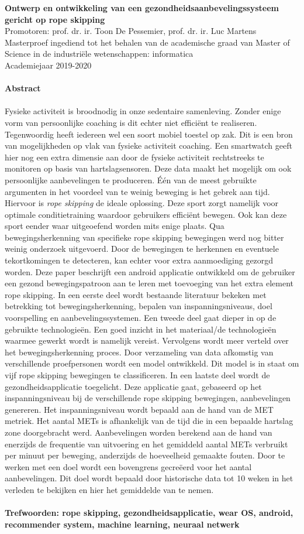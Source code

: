 \textbf{\Huge Ontwerp en ontwikkeling van een gezondheidsaanbevelingssysteem gericht op rope skipping} \\

Promotoren: prof. dr. ir. Toon De Pessemier, prof. dr. ir. Luc Martens \\
Masterproef ingediend tot het behalen van de academische graad van Master of Science in de industriële wetenschappen: informatica \\
Academiejaar 2019-2020
\\\\
\textbf{\LARGE Abstract} \\\\
Fysieke activiteit is broodnodig in onze sedentaire samenleving. Zonder enige vorm van persoonlijke coaching is dit echter niet efficiënt te realiseren. Tegenwoordig heeft iedereen wel een soort mobiel toestel op zak. Dit is een bron van mogelijkheden op vlak van fysieke activiteit coaching. Een smartwatch geeft hier nog een extra dimensie aan door de fysieke activiteit rechtstreeks te monitoren op basis van hartslagsensoren. Deze data maakt het mogelijk om ook persoonlijke aanbevelingen te produceren.
Één van de meest gebruikte argumenten in het voordeel van te weinig beweging is het gebrek aan tijd. Hiervoor is \textit{rope skipping} de ideale oplossing. Deze sport zorgt namelijk voor optimale conditietraining waardoor gebruikers efficiënt bewegen. Ook kan deze sport eender waar uitgeoefend worden mits enige plaats. Qua bewegingsherkenning van specifieke rope skipping bewegingen werd nog bitter weinig onderzoek uitgevoerd. Door de bewegingen te herkennen en eventuele tekortkomingen te detecteren, kan echter voor extra aanmoediging gezorgd worden.
Deze paper beschrijft een android applicatie ontwikkeld om de gebruiker een gezond bewegingspatroon aan te leren met toevoeging van het extra element rope skipping. 
In een eerste deel wordt bestaande literatuur bekeken met betrekking tot bewegingsherkenning, bepalen van inspanningsniveaus, doel voorspelling en aanbevelingssystemen.
Een tweede deel gaat dieper in op de gebruikte technologieën. Een goed inzicht in het materiaal/de technologieën waarmee gewerkt wordt is namelijk vereist. 
Vervolgens wordt meer verteld over het bewegingsherkenning proces. Door verzameling van data afkomstig van verschillende proefpersonen wordt een model ontwikkeld. Dit model is in staat om vijf rope skipping bewegingen te classificeren.
In een laatste deel wordt de gezondheidsapplicatie toegelicht. Deze applicatie gaat, gebaseerd op het inspanningsniveau bij de verschillende rope skipping bewegingen, aanbevelingen genereren. Het inspanningsniveau wordt bepaald aan de hand van de MET metriek. Het aantal METs is afhankelijk van de tijd die in een bepaalde hartslag zone doorgebracht werd. Aanbevelingen worden berekend aan de hand van enerzijds de frequentie van uitvoering en het gemiddeld aantal METs verbruikt per minuut per beweging, anderzijds de hoeveelheid gemaakte fouten. Door te werken met een doel wordt een bovengrens gecreëerd voor het aantal aanbevelingen. Dit doel wordt bepaald door historische data tot 10 weken in het verleden te bekijken en hier het gemiddelde van te nemen.\\\\

\noindent
\textbf{Trefwoorden: rope skipping, gezondheidsapplicatie, wear OS, android, recommender system, machine learning, neuraal netwerk}

